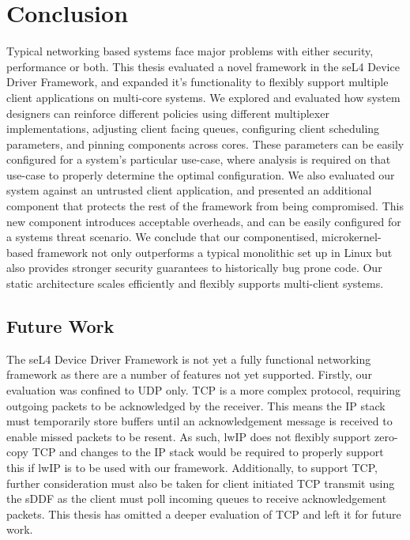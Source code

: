 \chapter{Conclusion}\label{ch:conclusion}

Typical networking based systems face major problems with either security, performance or both. 
This thesis evaluated a novel framework in the seL4 Device Driver Framework, and expanded it's 
functionality to flexibly support multiple client applications on multi-core systems. We explored
and evaluated how system designers can reinforce different policies using different multiplexer implementations,
adjusting client facing queues, configuring client scheduling parameters, and pinning components across cores.
These parameters can be easily configured for a system's particular use-case, where analysis is required
on that use-case to properly determine the optimal configuration.
We also evaluated our system against an untrusted client application, and 
presented an additional component that protects the rest of the framework from being compromised. 
This new component introduces acceptable overheads, and can be easily configured for a systems threat scenario. 
We conclude that our componentised, microkernel-based framework not only outperforms a typical monolithic
set up in Linux but also provides stronger security guarantees to historically bug prone code. Our static architecture
scales efficiently and flexibly supports multi-client systems. \\

\section{Future Work}

The seL4 Device Driver Framework is not yet a fully functional networking framework as there are a number of features
not yet supported. 
Firstly, our evaluation was confined to UDP only. TCP is a more complex protocol, requiring outgoing packets to be acknowledged 
by the receiver. This means the IP stack must temporarily store buffers until an acknowledgement message is received to enable missed packets 
to be resent. As such, lwIP does not flexibly support zero-copy TCP and changes to the IP stack would be required to properly
support this if lwIP is to be used with our framework. Additionally, to support TCP, further consideration must also be taken
for client initiated TCP transmit using the sDDF as the client must poll incoming queues to receive acknowledgement packets. 
This thesis has omitted a deeper evaluation of TCP and left it for future work. \\

